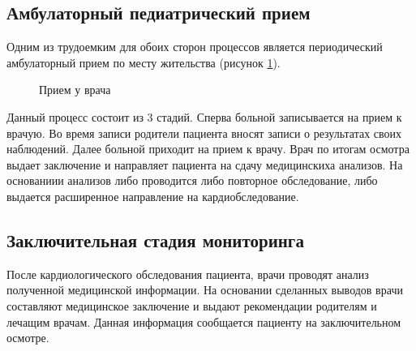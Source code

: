 \subsection{Амбулаторный педиатрический прием}

Одним из трудоемким для обоих сторон процессов является периодический
амбулаторный прием по месту жительства (рисунок \ref{ris:ambulator_appointment}).

\begin{figure}[h]
\caption{Прием у врача}
\label{ris:ambulator_appointment}
\end{figure}

Данный процесс состоит из 3 стадий. Сперва больной записывается на прием к
врачую. Во время записи родители пациента вносят записи о результатах своих
наблюдений. Далее больной приходит на прием к врачу. Врач по итогам осмотра
выдает заключение и направляет пациента на сдачу медицинскиха анализов. На
основаниии анализов либо проводится либо повторное обследование, либо выдается
расширенное направление на кардиобследование.

\subsection{Заключительная стадия мониторинга}

После кардиологического обследования пациента, врачи проводят анализ полученной
медицинской информации. На основании сделанных выводов врачи составляют
медицинское заключение и выдают рекомендации родителям и лечащим врачам. Данная
информация сообщается пациенту на заключительном осмотре.